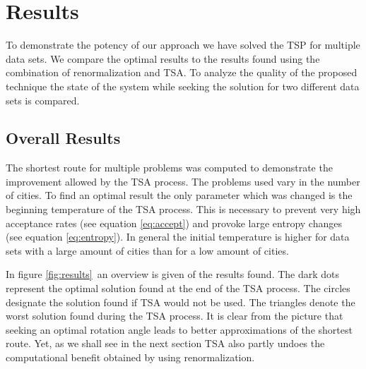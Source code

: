 \section{Results}
To demonstrate the potency of our approach we have solved the TSP for multiple
data sets. We compare the optimal results to the results found using the
combination of renormalization and TSA. To analyze the quality
of the proposed technique the state of the system while seeking the solution
for two different data sets is compared.

\subsection{Overall Results}
The shortest route for multiple problems was computed to demonstrate the
improvement allowed by the TSA process. The problems used vary in
the number of cities. To find an optimal result the only parameter which was
changed is the beginning temperature of the TSA process. This
is necessary to prevent very high acceptance rates (see equation
\ref{eq:accept}) and provoke large entropy changes (see equation
\ref{eq:entropy}). In general the initial temperature is higher for data sets
with a large amount of cities than for a low amount of cities.

In figure \ref{fig:results}~an overview is given of the results found. The
dark dots represent the optimal solution found at the end of the TSA process.
The circles designate the solution found if TSA would not be used. The
triangles denote the worst solution found during the TSA process. It is clear
from the picture that seeking an optimal rotation angle leads to better
approximations of the shortest route. Yet, as we shall see in the next section
TSA also partly undoes the computational benefit obtained by using renormalization.


